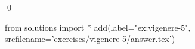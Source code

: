 
\begin{ex} 
  \label{ex:vigenere-5}
  
  \qed
\end{ex} 
\begin{python0}
from solutions import *
add(label="ex:vigenere-5",
    srcfilename='exercises/vigenere-5/answer.tex') 
\end{python0}
